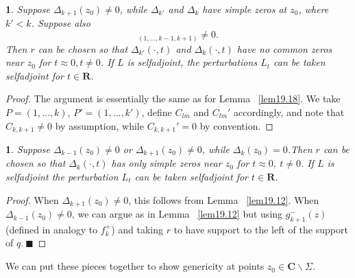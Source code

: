 \documentclass{surv-l}
\theoremstyle{plain}
\newtheorem{lemma}[theorem]{\sc{Lemma}}
\theoremstyle{definition}
\numberwithin{equation}{chapter}
\begin{document}
\setcounter{theorem}{20}
\begin{lemma}\label{lem19.21}  Suppose $\Delta_{k+1}(z_{0})\neq 0$,  while $\Delta_{k'}$ and $\Delta_{k}$ have simple zeros at $z_{0}$, where $k'<k$. Suppose also
\begin{equation*}
[f_{k}^{+}(z_{0})]_{(1,\ldots,k-1,k+1)}\neq 0.
\end{equation*}
Then $r$ can be chosen so that $\Delta_{k'}(\cdot, t)$ and $\Delta_{k}(\cdot,t)$ have no common zeros near $z_{0}$ for $t\approx 0,t\neq 0$. If $L$ is selfadjoint, the perturbations $L_{t}$ can be taken selfadjoint for $t\in \mathbf{R}$.
\end{lemma}
\begin{proof} The argument is essentially the same as for Lemma ~\ref{lem19.18}. We take $P= (1,\ldots, k)$, $P'=(1, \ldots, k')$, define $C_{lm}$ and $C_{lm}'$ accordingly, and note that $C_{k,k+1}\neq 0$ by assumption, while $C_{k,k+1}'=0$ by convention.
\end{proof}
\begin{lemma}\label{lem19.22} Suppose $\Delta_{k-1}(z_{0})\neq 0$ or $\Delta_{k+1}(z_{0})\neq 0$,  while $\Delta_{k}(z_{0})=0$.Then $r$ can be chosen so that $\Delta_{k}(\cdot,t)$ has only simple zeros near $z_{0}$ for $t\approx 0,\ t\neq 0$. If $L$ is selfadjoint the perturbation $L_{t}$ can be taken selfadjoint for $t\in \mathbf{R}$.
\end{lemma}
\begin{proof} When $\Delta_{k+1}(z_{0})\neq 0$, this follows from Lemma ~\ref{lem19.12}. When $\Delta_{k-1}(z_{0})\neq 0$, we can argue as in Lemma ~\ref{lem19.12} but using $g_{k+1}^{-}(z)$ (defined in analogy to $f_{k}^{+}$) and taking $r$ to have support to the left of the support of $q.\ \blacksquare$
\end{proof}
We can put these pieces together to show genericity at points $ z_{0}\in \mathbf{C}\backslash \Sigma$.
\end{document}
